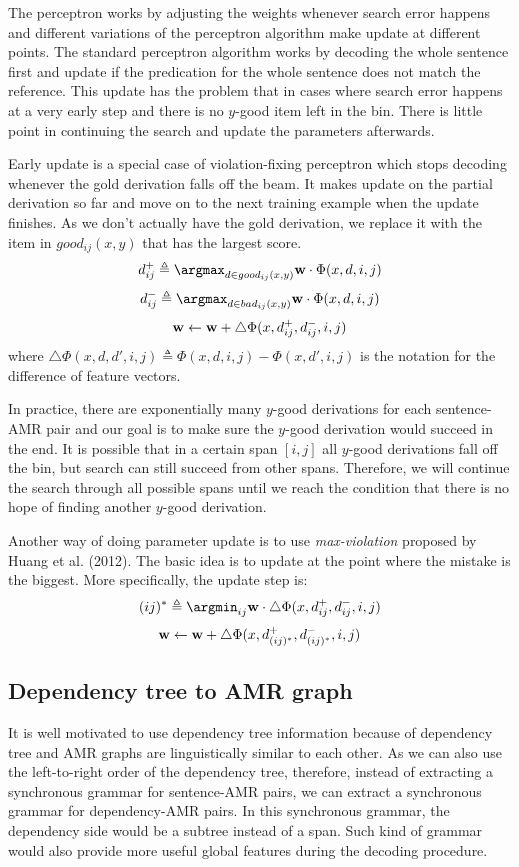 The perceptron works by adjusting the weights whenever search error happens and different variations of the perceptron algorithm make update
at different points. The standard perceptron algorithm works by decoding the whole sentence first and update if the predication for the whole
sentence does not match the reference. This update has the problem that in cases where search error happens at a very early step and there is
no $y$-good item left in the bin. There is little point in continuing the search and update the parameters afterwards.


Early update is a special case of violation-fixing perceptron which stops decoding whenever the gold derivation falls off the beam. It makes update on the partial derivation so far and 
move on to the next training example when the update finishes. As we don't actually have the gold derivation, we replace it with
the item in $good_{ij}(x,y)$ that has the largest score.
$$d_{ij}^{+} \triangleq {\bf \argmax}_{d\in good_{ij}(x,y)} {\bf w}\cdot \Phi(x, d, i, j)$$
$$d_{ij}^{-} \triangleq {\bf \argmax}_{d\in bad_{ij}(x,y)} {\bf w}\cdot \Phi(x, d, i, j)$$
$${\bf w} \leftarrow {\bf w} + \triangle \Phi(x, d_{ij}^{+}, d_{ij}^{-}, i, j)$$
where $\triangle \Phi(x, d, d', i, j) \triangleq \Phi(x, d, i, j) - \Phi(x, d', i, j)$ is the notation for the difference of feature vectors.


In practice, there are exponentially many $y$-good derivations for each sentence-AMR pair and our goal is to make sure the $y$-good derivation would succeed in the end. 
It is possible that in a certain span $[i,j]$ all $y$-good derivations fall off the bin, but search can still succeed from other spans.
Therefore, we will continue the search through all possible spans until we reach the condition that there is no hope of finding another 
$y$-good derivation.


Another way of doing parameter update is to use \textit{max-violation} proposed by Huang et al. (2012). The basic idea is to update at the
point where the mistake is the biggest. More specifically, the update step is:
$$(ij)^{*} \triangleq {\argmin}_{ij} {\bf w} \cdot \triangle \Phi(x, d_{ij}^{+}, d_{ij}^{-}, i, j)$$
$${\bf w} \leftarrow {\bf w} + \triangle \Phi(x, d_{(ij)^*}^{+}, d_{(ij)^*}^{-}, i, j)$$

\subsection{Dependency tree to AMR graph}
It is well motivated to use dependency tree information because of dependency tree and AMR graphs are linguistically similar to each other.
As we can also use the left-to-right order of the dependency tree, therefore, instead of extracting a synchronous grammar for sentence-AMR pairs, we can
extract a synchronous grammar for dependency-AMR pairs.
In this synchronous grammar, the dependency side would be a subtree instead of a span. Such kind of grammar would also provide more useful global features during the decoding procedure.

